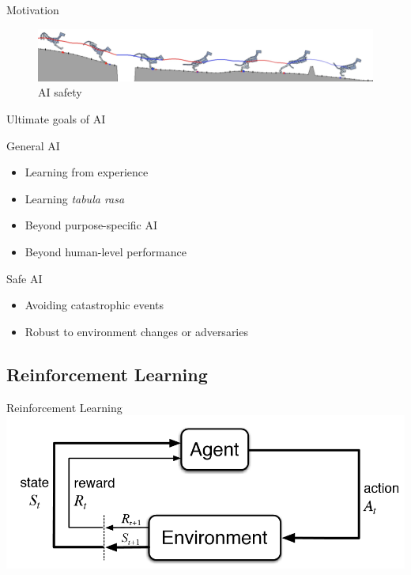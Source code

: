 \documentclass{beamer}
\begin{document}
\begin{frame}{Motivation}
\begin{figure}
\includegraphics[width=\linewidth]{../gfx/running_tiger.png}
\caption{AI safety}
\end{figure}
\end{frame}


\begin{frame}{Ultimate goals of AI}

\begin{block}{General AI}
\begin{itemize}
\item Learning from experience
\item Learning \textit{tabula rasa}
\item Beyond purpose-specific AI
\item Beyond human-level performance
\end{itemize}
\end{block}

\begin{block}{Safe AI}
\begin{itemize}
\item Avoiding catastrophic events
\item Robust to environment changes or adversaries
\end{itemize}
\end{block}

\end{frame}




\subsection{Reinforcement Learning}

\begin{frame}{Reinforcement Learning}
\includegraphics[width=\linewidth]{../gfx/rl_cycle.png}
\end{frame}
\end{document}

